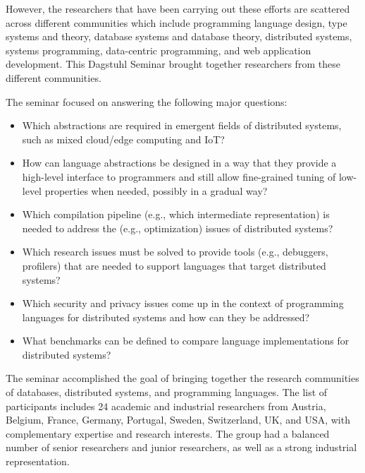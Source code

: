 \documentclass[a4paper,UKenglish]{dagrep-v2018}
\begin{document}
However, the researchers that have been carrying out these efforts are scattered across different communities which include programming language design, type systems and theory, database systems and database theory, distributed systems, systems programming, data-centric programming, and web application development. This Dagstuhl Seminar brought together researchers from these different communities.

The seminar focused on answering the following major questions: %

\begin{itemize}

\item Which abstractions are required in emergent fields of distributed systems, such as mixed cloud/edge computing and IoT?

\item How can language abstractions be designed in a way that they provide a high-level interface to programmers and still allow fine-grained tuning of low-level properties when needed, possibly in a gradual way?

\item Which compilation pipeline (e.g., which intermediate representation) is needed to address the (e.g., optimization) issues of distributed systems?

\item Which research issues must be solved to provide tools (e.g., debuggers, profilers) that are needed to support languages that target distributed systems?

\item Which security and privacy issues come up in the context of programming languages for distributed systems and how can they be addressed?

\item What benchmarks can be defined to compare language implementations for distributed systems?
\end{itemize}

The seminar accomplished the goal of bringing together the research communities of databases, distributed systems, and programming languages. The list of participants includes  24 academic and industrial researchers from Austria, Belgium, France, Germany, Portugal, Sweden, Switzerland, UK, and USA, with complementary expertise and research interests. 
The group had a balanced number of senior researchers and junior researchers, as well as a strong industrial representation.
\end{document}
